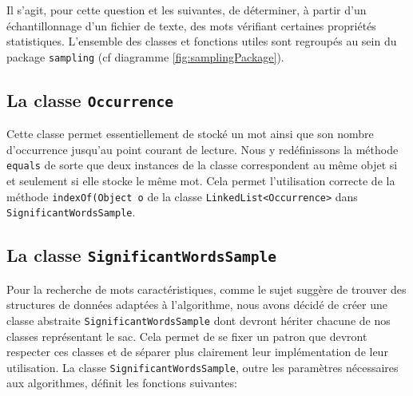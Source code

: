 \documentclass[12pt,a4paper,titlepage]{article}
\newcommand{\class}[1]{\texttt{#1}}
\begin{document}
Il s'agit, pour cette question et les suivantes, de déterminer, à partir d'un échantillonnage d'un fichier de texte, des mots vérifiant certaines propriétés statistiques. L'ensemble des classes et fonctions utiles sont regroupés au sein du package \class{sampling} (cf diagramme \ref{fig:samplingPackage}).\\

\subsection{La classe \class{Occurrence}}

Cette classe permet essentiellement de stocké un mot ainsi que son nombre d'occurrence jusqu'au point courant de lecture. Nous y redéfinissons la méthode \class{equals} de sorte que deux instances de la classe correspondent au même objet si et seulement si elle stocke le même mot. Cela permet l'utilisation correcte de la méthode \class{indexOf(Object o} de la classe \class{LinkedList<Occurrence>} dans \class{SignificantWordsSample}.


\subsection{La classe \class{SignificantWordsSample}}

Pour la recherche de mots caractéristiques, comme le sujet suggère de trouver des structures de données adaptées à l'algorithme, nous avons décidé de créer une classe abstraite \class{SignificantWordsSample} dont devront hériter chacune de nos classes représentant le sac. Cela permet de se fixer un patron que devront respecter ces classes et de séparer plus clairement leur implémentation de leur utilisation. La classe \class{SignificantWordsSample}, outre les paramètres nécessaires aux algorithmes, définit les fonctions suivantes:
\end{document}
